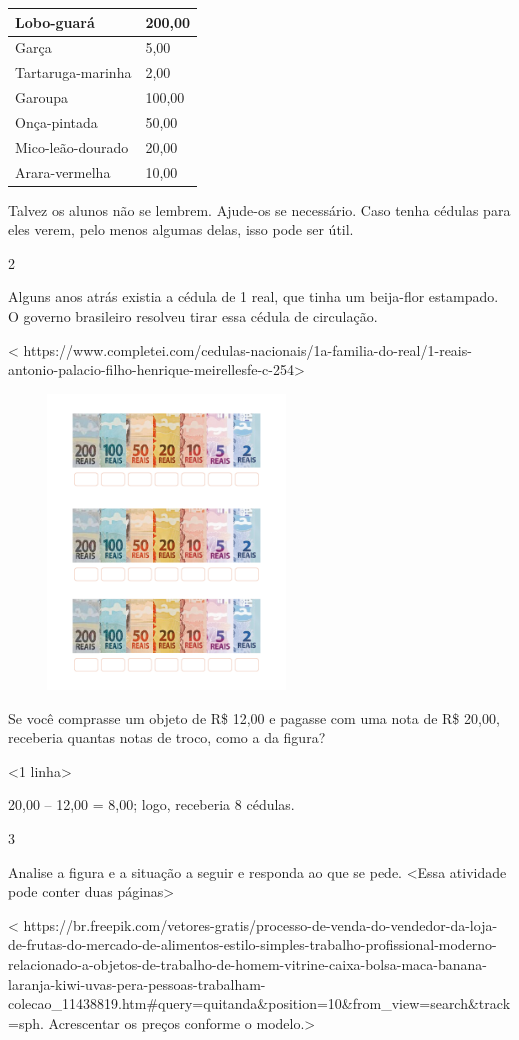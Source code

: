{{{{{{{{{\begin{longtable}[]{@{}ll@{}}
\toprule
Lobo-guará & 200,00\tabularnewline
\midrule
\endhead
Garça & 5,00\tabularnewline
Tartaruga-marinha & 2,00\tabularnewline
Garoupa & 100,00\tabularnewline
Onça-pintada & 50,00\tabularnewline
Mico-leão-dourado & 20,00\tabularnewline
Arara-vermelha & 10,00\tabularnewline
\bottomrule
\end{longtable}

Talvez os alunos não se lembrem. Ajude-os se necessário. Caso tenha cédulas para eles verem, pelo menos algumas delas, isso pode ser útil.

\num{2}

Alguns anos atrás existia a cédula de 1 real, que tinha um beija-flor
estampado. O governo brasileiro resolveu tirar essa cédula de circulação.

\textless{}
https://www.completei.com/cedulas-nacionais/1a-familia-do-real/1-reais-antonio-palacio-filho-henrique-meirellesfe-c-254\textgreater{}

\includegraphics[width=3.30208in,height=3.08528in]{media/image70.png}

Se você comprasse um objeto de R\$ 12,00 e pagasse com uma nota de R\$
20,00, receberia quantas notas de troco, como a da figura?

\textless{}1 linha\textgreater{}

20,00 -- 12,00 = 8,00; logo, receberia 8 cédulas.

\num{3}

Analise a figura e a situação a seguir e responda ao que se pede.
\textless{}Essa atividade pode conter duas páginas\textgreater{}

\textless{}
https://br.freepik.com/vetores-gratis/processo-de-venda-do-vendedor-da-loja-de-frutas-do-mercado-de-alimentos-estilo-simples-trabalho-profissional-moderno-relacionado-a-objetos-de-trabalho-de-homem-vitrine-caixa-bolsa-maca-banana-laranja-kiwi-uvas-pera-pessoas-trabalham-colecao\_11438819.htm\#query=quitanda\&position=10\&from\_view=search\&track=sph.
Acrescentar os preços conforme o modelo.\textgreater{}

}}}}}}}}}

